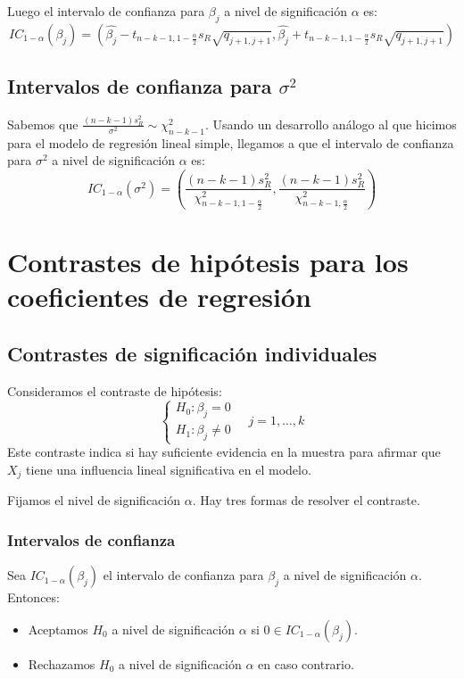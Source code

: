 \documentclass{report}
\theoremstyle{remark}
\theoremstyle{remark}
\theoremstyle{remark}
\theoremstyle{definition}
\theoremstyle{definition}
\theoremstyle{definition}
\begin{document}
Luego el intervalo de confianza para $\beta_j$ a nivel de significación $\alpha$ es:
$$IC_{1-\alpha}(\beta_j) = \left( \hat{\beta_j} - t_{n-k-1, 1-\frac{\alpha}{2}} s_R \sqrt{q_{j+1, j+1}}, \hat{\beta_j} + t_{n-k-1, 1-\frac{\alpha}{2}} s_R \sqrt{q_{j+1, j+1}} \right)$$

\subsection*{Intervalos de confianza para $\sigma^2$}
Sabemos que $\frac{(n-k-1)s_R^2}{\sigma^2} \sim \chi^2_{n-k-1}$.
Usando un desarrollo análogo al que hicimos para el modelo de regresión lineal simple, llegamos a que el intervalo de confianza para $\sigma^2$ a nivel de significación $\alpha$ es:
$$IC_{1-\alpha}(\sigma^2) = \left( \frac{(n-k-1)s_R^2}{\chi^2_{n-k-1, 1-\frac{\alpha}{2}}}, \frac{(n-k-1)s_R^2}{\chi^2_{n-k-1, \frac{\alpha}{2}}} \right)$$

\section{Contrastes de hipótesis para los coeficientes de regresión}
\subsection*{Contrastes de significación individuales}
Consideramos el contraste de hipótesis:
$$\begin{cases}
        H_0: \beta_j = 0 \\
        H_1: \beta_j \neq 0
    \end{cases} \quad j = 1, \dots, k$$
Este contraste indica si hay suficiente evidencia en la muestra para afirmar que $X_j$ tiene una influencia lineal significativa en el modelo.

Fijamos el nivel de significación $\alpha$.
Hay tres formas de resolver  el contraste.

\subsubsection*{Intervalos de confianza}
Sea $IC_{1-\alpha}(\beta_j)$ el intervalo de confianza para $\beta_j$ a nivel de significación $\alpha$.
Entonces:
\begin{itemize}
    \item Aceptamos $H_0$ a nivel de significación $\alpha$ si $0 \in IC_{1-\alpha}(\beta_j)$.
    \item Rechazamos $H_0$ a nivel de significación $\alpha$ en caso contrario.
\end{itemize}
\end{document}
